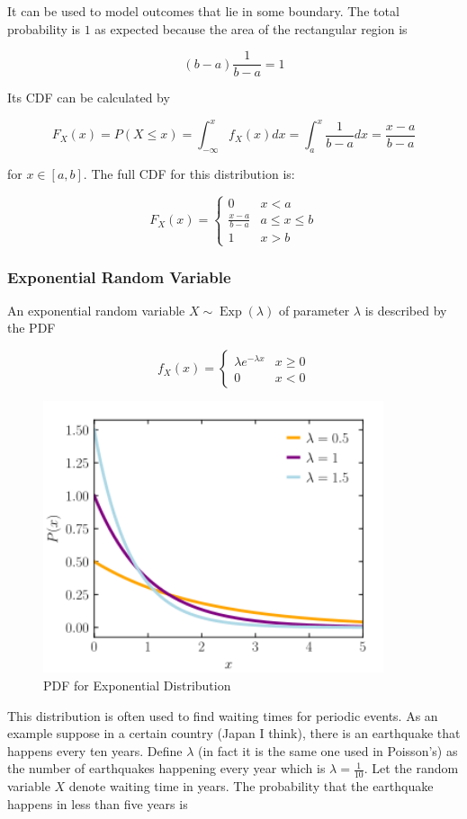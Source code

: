 \documentclass[12pt, a4paper]{article}
\newcounter{exa}
\newcommand{\Exp}{\operatorname{Exp}}
\begin{document}
It can be used to model outcomes that lie in some boundary. The total probability is $1$ as expected because the area of the rectangular region is

$$(b-a)\frac{1}{b-a}=1$$

Its CDF can be calculated by

\[F_X(x)=P(X\le x)=\int_{-\infty}^x f_X(x) dx = \int_a^x \frac{1}{b-a} dx = \frac{x-a}{b-a}\]

for $x\in[a,b]$. The full CDF for this distribution is:

\[F_X(x)=\begin{cases} 0 & x<a \\ \frac{x-a}{b-a} & a\le x \le b \\ 1 & x>b \end{cases}\]

\subsubsection{Exponential Random Variable}

An exponential random variable $X\sim\Exp(\lambda)$ of parameter $\lambda$ is described by the PDF

$$
f_X(x)=\begin{cases}
\lambda  e^{-\lambda x} & x \ge 0 \\
0 & x < 0
\end{cases}
$$

\begin{figure}[H]
\centering
\includegraphics[width=100mm]{14.png}
\caption{PDF for Exponential Distribution}
\end{figure}

This distribution is often used to find waiting times for periodic events. As an example suppose in a certain country (Japan I think), there is an earthquake that happens every ten years. Define $\lambda$ (in fact it is the same one used in Poisson's) as the number of earthquakes happening every year which is $\lambda=\frac{1}{10}$. Let the random variable $X$ denote waiting time in years. The probability that the earthquake happens in less than five years is
\end{document}
